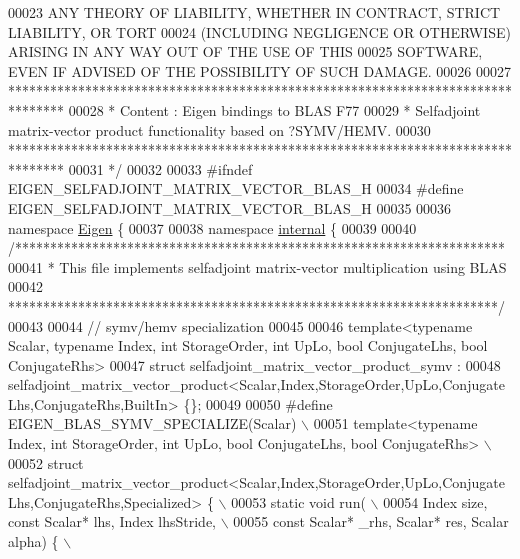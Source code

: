 \begin{DoxyCode}
00023 \textcolor{comment}{ ANY THEORY OF LIABILITY, WHETHER IN CONTRACT, STRICT LIABILITY, OR TORT}
00024 \textcolor{comment}{ (INCLUDING NEGLIGENCE OR OTHERWISE) ARISING IN ANY WAY OUT OF THE USE OF THIS}
00025 \textcolor{comment}{ SOFTWARE, EVEN IF ADVISED OF THE POSSIBILITY OF SUCH DAMAGE.}
00026 \textcolor{comment}{}
00027 \textcolor{comment}{ ********************************************************************************}
00028 \textcolor{comment}{ *   Content : Eigen bindings to BLAS F77}
00029 \textcolor{comment}{ *   Selfadjoint matrix-vector product functionality based on ?SYMV/HEMV.}
00030 \textcolor{comment}{ ********************************************************************************}
00031 \textcolor{comment}{*/}
00032 
00033 \textcolor{preprocessor}{#ifndef EIGEN\_SELFADJOINT\_MATRIX\_VECTOR\_BLAS\_H}
00034 \textcolor{preprocessor}{#define EIGEN\_SELFADJOINT\_MATRIX\_VECTOR\_BLAS\_H}
00035 
00036 \textcolor{keyword}{namespace }\hyperlink{namespace_eigen}{Eigen} \{ 
00037 
00038 \textcolor{keyword}{namespace }\hyperlink{namespaceinternal}{internal} \{
00039 
00040 \textcolor{comment}{/**********************************************************************}
00041 \textcolor{comment}{* This file implements selfadjoint matrix-vector multiplication using BLAS}
00042 \textcolor{comment}{**********************************************************************/}
00043 
00044 \textcolor{comment}{// symv/hemv specialization}
00045 
00046 \textcolor{keyword}{template}<\textcolor{keyword}{typename} Scalar, \textcolor{keyword}{typename} Index, \textcolor{keywordtype}{int} StorageOrder, \textcolor{keywordtype}{int} UpLo, \textcolor{keywordtype}{bool} ConjugateLhs, \textcolor{keywordtype}{bool} ConjugateRhs>
00047 \textcolor{keyword}{struct }selfadjoint\_matrix\_vector\_product\_symv :
00048   selfadjoint\_matrix\_vector\_product<Scalar,Index,StorageOrder,UpLo,ConjugateLhs,ConjugateRhs,BuiltIn> \{\};
00049 
00050 \textcolor{preprocessor}{#define EIGEN\_BLAS\_SYMV\_SPECIALIZE(Scalar) \(\backslash\)}
00051 \textcolor{preprocessor}{template<typename Index, int StorageOrder, int UpLo, bool ConjugateLhs, bool ConjugateRhs> \(\backslash\)}
00052 \textcolor{preprocessor}{struct
       selfadjoint\_matrix\_vector\_product<Scalar,Index,StorageOrder,UpLo,ConjugateLhs,ConjugateRhs,Specialized> \{ \(\backslash\)}
00053 \textcolor{preprocessor}{static void run( \(\backslash\)}
00054 \textcolor{preprocessor}{  Index size, const Scalar*  lhs, Index lhsStride, \(\backslash\)}
00055 \textcolor{preprocessor}{  const Scalar* \_rhs, Scalar* res, Scalar alpha) \{ \(\backslash\)}

\end{DoxyCode}
